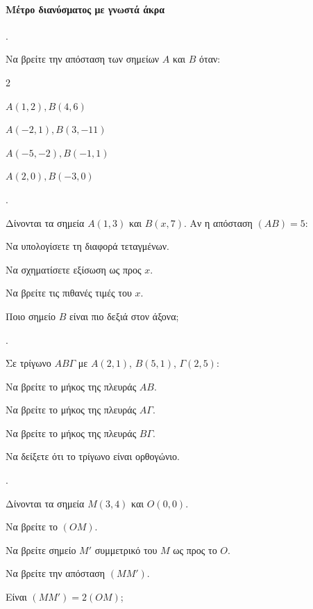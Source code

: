 \documentclass[11pt,a4paper,twocolumn]{article}
\newcounter{askhsh}
\newcommand{\askhsh}{\large\theaskhsh.\ \addtocounter{askhsh}{1}}
\begin{document}
\paragraph{Μέτρο διανύσματος με γνωστά άκρα}
\askhsh Να βρείτε την απόσταση των σημείων $A$ και $B$ όταν:
\begin{multicols}{2}
\begin{alist}
    \item $A(1, 2), B(4, 6)$
    \item $A(-2, 1), B(3, -11)$
    \item $A(-5, -2), B(-1, 1)$
    \item $A(2, 0), B(-3, 0)$
\end{alist}
\end{multicols}

\askhsh Δίνονται τα σημεία $A(1, 3)$ και $B(x, 7)$. Αν η απόσταση $(AB)=5$:

\begin{alist}
    \item Να υπολογίσετε τη διαφορά τεταγμένων.
    \item Να σχηματίσετε εξίσωση ως προς $x$.
    \item Να βρείτε τις πιθανές τιμές του $x$.
    \item Ποιο σημείο $B$ είναι πιο δεξιά στον άξονα;
\end{alist}


\askhsh Σε τρίγωνο $AB\Gamma$ με $A(2,1)$, $B(5,1)$, $\Gamma(2,5)$:

\begin{alist}
    \item Να βρείτε το μήκος της πλευράς $AB$.
    \item Να βρείτε το μήκος της πλευράς $A\Gamma$.
    \item Να βρείτε το μήκος της πλευράς $B\Gamma$.
    \item Να δείξετε ότι το τρίγωνο είναι ορθογώνιο.
\end{alist}


\askhsh Δίνονται τα σημεία $M(3, 4)$ και $O(0, 0)$.

\begin{alist}
    \item Να βρείτε το $(OM)$.
    \item Να βρείτε σημείο $M'$ συμμετρικό του $M$ ως προς το $O$.
    \item Να βρείτε την απόσταση $(MM')$.
    \item Είναι $(MM') = 2(OM)$;
\end{alist}
\end{document}
